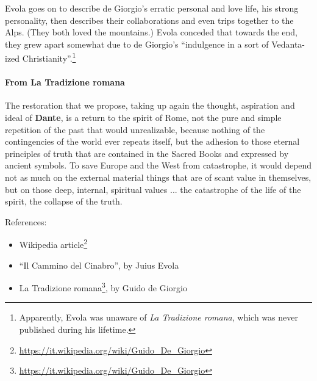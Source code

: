Evola goes on to describe de Giorgio's erratic personal and love life, his strong personality, then describes their collaborations and even trips together to the Alps. (They both loved the mountains.) Evola conceded that towards the end, they grew apart somewhat due to de Giorgio's ``indulgence in a sort of Vedanta-ized Christianity''.\footnote{Apparently, Evola was unaware of \emph{La Tradizione romana}, which was never published during his lifetime.}

\paragraph{From La Tradizione romana}


\begin{quotex}
The restoration that we propose, taking up again the thought, aspiration and ideal of \textbf{Dante}, is a return to the spirit of Rome, not the pure and simple repetition of the past that would unrealizable, because nothing of the contingencies of the world ever repeats itself, but the adhesion to those eternal principles of truth that are contained in the Sacred Books and expressed by ancient symbols. To save Europe and the West from catastrophe, it would depend not as much on the external material things that are of scant value in themselves, but on those deep, internal, spiritual values ... the catastrophe of the life of the spirit, the collapse of the truth.
\end{quotex}

References:

\begin{itemize}


\item Wikipedia article\footnote{\url{https://it.wikipedia.org/wiki/Guido\_De\_Giorgio}}

\item ``Il Cammino del Cinabro'', by Juius Evola

\item La Tradizione romana\footnote{\url{https://it.wikipedia.org/wiki/Guido\_De\_Giorgio}}, by Guido de Giorgio
\end{itemize}





